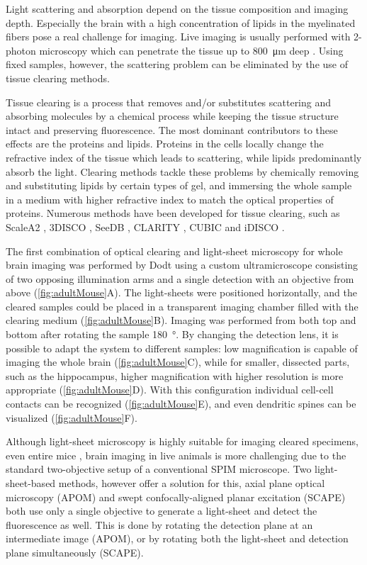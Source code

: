     Light scattering and absorption depend on the tissue composition and imaging depth. Especially the brain with a high concentration of lipids in the myelinated fibers pose a real challenge for imaging. Live imaging is usually performed with 2-photon microscopy which can penetrate the tissue up to \SI{800}{\micro m} deep \cite{katona_fast_2012}. Using fixed samples, however, the scattering problem can be eliminated by the use of tissue clearing methods.

    Tissue clearing is a process that removes and/or substitutes scattering and absorbing molecules by a chemical process while keeping the tissue structure intact and preserving fluorescence. The most dominant contributors to these effects are the proteins and lipids. Proteins in the cells locally change the refractive index of the tissue which leads to scattering, while lipids predominantly absorb the light. Clearing methods tackle these problems by chemically removing and substituting lipids by certain types of gel, and immersing the whole sample in a medium with higher refractive index to match the optical properties of proteins. Numerous methods have been developed for tissue clearing, such as ScaleA2 \cite{hama_scale:_2011}, 3DISCO \cite{erturk_three-dimensional_2012,erturk_three-dimensional_2012-1}, SeeDB \cite{ke_seedb:_2013}, CLARITY \cite{chung_clarity_2013}, CUBIC \cite{susaki_whole-brain_2014} and iDISCO \cite{renier_idisco:_2014}.

    The first combination of optical clearing and light-sheet microscopy for whole brain imaging was performed by Dodt \etal using a custom ultramicroscope consisting of two opposing illumination arms and a single detection with an objective from above (\autoref{fig:adultMouse}A). The light-sheets were positioned horizontally, and the cleared samples could be placed in a transparent imaging chamber filled with the clearing medium (\autoref{fig:adultMouse}B). Imaging was performed from both top and bottom after rotating the sample \SI{180}{\degree}. By changing the detection lens, it is possible to adapt the system to different samples: low magnification is capable of imaging the whole brain (\autoref{fig:adultMouse}C), while for smaller, dissected parts, such as the hippocampus, higher magnification with higher resolution is more appropriate (\autoref{fig:adultMouse}D). With this configuration individual cell-cell contacts can be recognized (\autoref{fig:adultMouse}E), and even dendritic spines can be visualized (\autoref{fig:adultMouse}F).

    Although light-sheet microscopy is highly suitable for imaging cleared specimens, even entire mice \cite{tainaka_whole-body_2014}, brain imaging in live animals is more challenging due to the standard two-objective setup of a conventional SPIM microscope. Two light-sheet-based methods, however offer a solution for this, axial plane optical microscopy (APOM) \cite{li_axial_2014} and swept confocally-aligned planar excitation (SCAPE) \cite{bouchard_swept_2015} both use only a single objective to generate a light-sheet and detect the fluorescence as well. This is done by rotating the detection plane at an intermediate image (APOM), or by rotating both the light-sheet and detection plane simultaneously (SCAPE).


